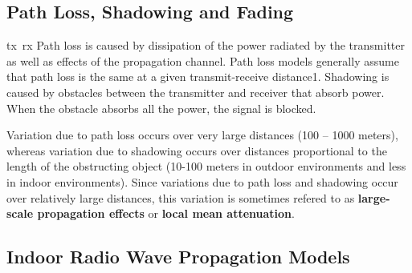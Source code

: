 \subsection{Path Loss, Shadowing and Fading}
\gls{tx}~\gls{rx}
Path loss is caused by dissipation of the power radiated by the transmitter as well as effects of the propagation channel.
Path loss models generally assume that path loss is the same at a given transmit-receive distance1.
Shadowing is caused by obstacles between the transmitter and receiver that absorb power.
When the obstacle absorbs all the power, the signal is blocked.

Variation due to path loss occurs over very large distances (100 -- 1000 meters), whereas variation due to shadowing occurs over distances proportional to the length of the obstructing object (10-100 meters in outdoor environments and less in indoor environments).
Since variations due to path loss and shadowing occur over relatively large distances, this variation is sometimes refered to as \textbf{large-scale propagation effects} or \textbf{local mean attenuation}.

\subsection{Indoor Radio Wave Propagation Models}


\pagebreak
